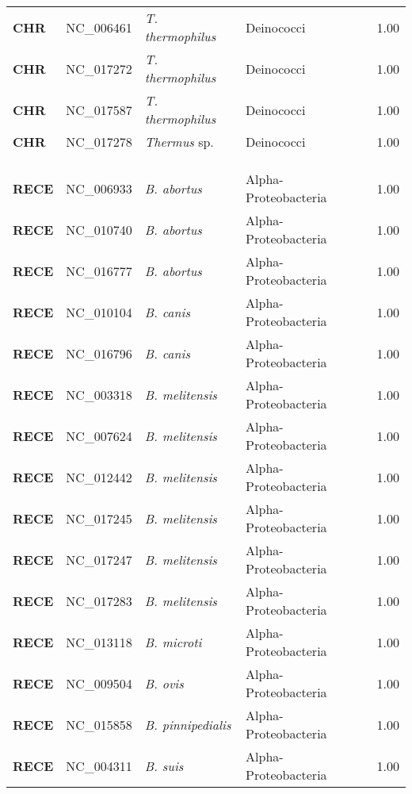 \begin{adjustwidth}{-3cm}{2cm}
{\begin{supertabular}{>{\bfseries}l|p{0.1\textwidth}p{0.14\textwidth}l|l}
CHR & NC\_006461 & \textit{T. thermophilus} & Deinococci & 1.00\\
CHR & NC\_017272 & \textit{T. thermophilus} & Deinococci & 1.00\\
CHR & NC\_017587 & \textit{T. thermophilus} & Deinococci & 1.00\\
CHR & NC\_017278 & \textit{Thermus} sp. & Deinococci & 1.00\\
\\
\\
\hline\\
RECE & NC\_006933 & \textit{B. abortus} & Alpha-Proteobacteria & 1.00\\
RECE & NC\_010740 & \textit{B. abortus} & Alpha-Proteobacteria & 1.00\\
RECE & NC\_016777 & \textit{B. abortus} & Alpha-Proteobacteria & 1.00\\
RECE & NC\_010104 & \textit{B. canis} & Alpha-Proteobacteria & 1.00\\
RECE & NC\_016796 & \textit{B. canis} & Alpha-Proteobacteria & 1.00\\
RECE & NC\_003318 & \textit{B. melitensis} & Alpha-Proteobacteria & 1.00\\
RECE & NC\_007624 & \textit{B. melitensis} & Alpha-Proteobacteria & 1.00\\
RECE & NC\_012442 & \textit{B. melitensis} & Alpha-Proteobacteria & 1.00\\
RECE & NC\_017245 & \textit{B. melitensis} & Alpha-Proteobacteria & 1.00\\
RECE & NC\_017247 & \textit{B. melitensis} & Alpha-Proteobacteria & 1.00\\
RECE & NC\_017283 & \textit{B. melitensis} & Alpha-Proteobacteria & 1.00\\
RECE & NC\_013118 & \textit{B. microti} & Alpha-Proteobacteria & 1.00\\
RECE & NC\_009504 & \textit{B. ovis} & Alpha-Proteobacteria & 1.00\\
RECE & NC\_015858 & \textit{B. pinnipedialis} & Alpha-Proteobacteria & 1.00\\
RECE & NC\_004311 & \textit{B. suis} & Alpha-Proteobacteria & 1.00\\

\end{supertabular}}
\end{adjustwidth}
